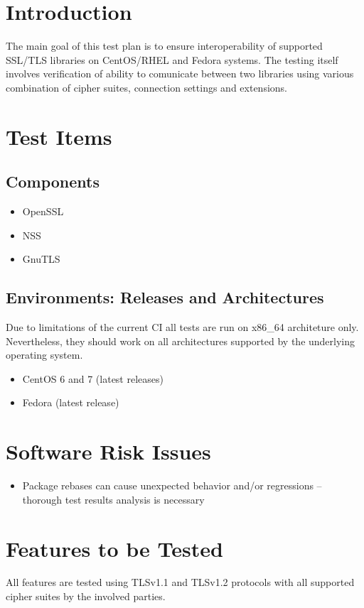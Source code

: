 \section{Introduction}
    The main goal of this test plan is to ensure interoperability of supported
    SSL/TLS libraries on CentOS/RHEL and Fedora systems. The testing itself involves
    verification of ability to comunicate between two libraries using various
    combination of cipher suites, connection settings and extensions.

\section{Test Items}
\subsection{Components}
    \begin{itemize}
        \item OpenSSL
        \item NSS
        \item GnuTLS
    \end{itemize}

\subsection{Environments: Releases and Architectures}
    Due to limitations of the current CI all tests are run on x86\_64 architeture
    only. Nevertheless, they should work on all architectures supported by
    the underlying operating system.

    \begin{itemize}
        \item CentOS 6 and 7 (latest releases)
        \item Fedora (latest release)
    \end{itemize}

\section{Software Risk Issues}
    \begin{itemize}
        \item Package rebases can cause unexpected behavior and/or regressions
              -- thorough test results analysis is necessary
    \end{itemize}

\section{Features to be Tested}
    All features are tested using TLSv1.1 and TLSv1.2 protocols with all supported
    cipher suites by the involved parties.

